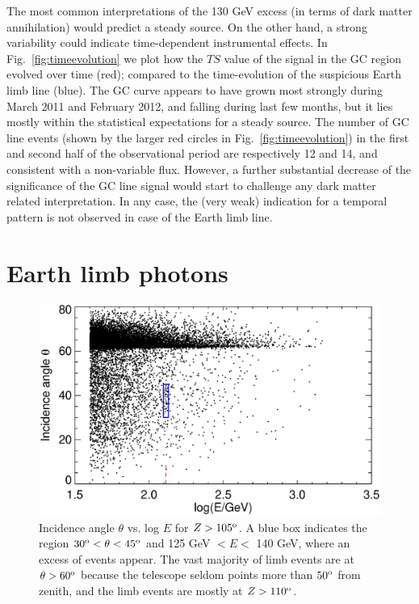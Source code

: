 \documentclass[aps,twocolumn,prd,superscriptaddress,showpacs,nofootinbib,fixfloat]{revtex4}
\newcommand{\degree}{^{\rm o}}
\begin{document}
The most common interpretations of the 130 GeV excess (in
terms of dark matter annihilation) would predict a steady
source. On the other hand, a strong variability could
indicate time-dependent instrumental effects. In
Fig.~\ref{fig:timeevolution} we plot how the $TS$ value of
the signal in the GC region evolved over time (red);
compared to the time-evolution of the suspicious Earth limb
line (blue). The GC curve appears to have grown most
strongly during March 2011 and February 2012, and falling
during last few months, but it lies mostly within the
statistical expectations for a steady source. The number of
GC line events (shown by the larger red circles in
Fig.~\ref{fig:timeevolution}) in the first and second half
of the observational period are respectively 12 and 14, and
consistent with a non-variable flux. However, a further
substantial decrease of the significance of the GC line
signal would start to challenge any dark matter related
interpretation.  In any case, the (very weak) indication for
a temporal pattern is not observed in case of the Earth limb
line. 

\section{Earth limb photons}
\label{sec:EarthLimb}

\begin{figure}
  \centering
  \includegraphics[width=1.0\linewidth]{plots/theta-E.ps}
  \caption{Incidence angle $\theta$ vs. log $E$ for $Z >
  105\degree$.  A blue box indicates the region $30\degree <
  \theta < 45\degree$ and 125 GeV $< E <$ 140 GeV, where an
  excess of events appear.  The vast majority of limb events
  are at $\theta > 60\degree$ because the telescope seldom
  points more than $50\degree$ from zenith, and the limb
  events are mostly at $Z>110\degree$.}
  \label{fig:theta-E}
\end{figure}
\end{document}
